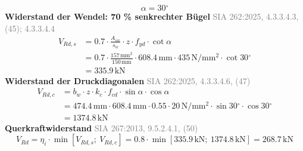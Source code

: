 \documentclass[11pt,a4paper]{article}
\newcommand{\normref}[1]{{\small\textcolor{gray}{#1}}}
\begin{document}
\begin{equation*}
\alpha = 30{}^{\circ}
\end{equation*}
\noindent\textbf{Widerstand der Wendel: 70 \% senkrechter Bügel} \hfill \normref{SIA 262:2025, 4.3.3.4.3, (45); 4.3.3.4.4}
\begin{equation*}
\begin{aligned}
  V_{Rd,s} &= 0.7 \cdot \frac{A_{sw}}{s_w} \cdot z \cdot f_{yd} \cdot \cot \alpha \\
  &= 0.7 \cdot \frac{157\,\mathrm{mm}^{2}}{150\,\mathrm{mm}} \cdot 608.4\,\mathrm{mm} \cdot 435\,\mathrm{N}/\mathrm{mm}^{2} \cdot \cot 30{}^{\circ} \\
  &= 335.9\,\mathrm{kN}
\end{aligned}
\end{equation*}
\noindent\textbf{Widerstand der Druckdiagonalen} \hfill \normref{SIA 262:2025, 4.3.3.4.6, (47)}
\begin{equation*}
\begin{aligned}
  V_{Rd,c} &= b_w \cdot z \cdot k_c \cdot f_{cd} \cdot \sin \alpha \cdot \cos \alpha \\
  &= 474.4\,\mathrm{mm} \cdot 608.4\,\mathrm{mm} \cdot 0.55 \cdot 20\,\mathrm{N}/\mathrm{mm}^{2} \cdot \sin 30{}^{\circ} \cdot \cos 30{}^{\circ} \\
  &= 1374.8\,\mathrm{kN}
\end{aligned}
\end{equation*}
\noindent\textbf{Querkraftwiderstand} \hfill \normref{SIA 267:2013, 9.5.2.4.1, (50)}
\begin{equation*}
V_{Rd} = \eta_i \cdot \min\left[V_{Rd,s};\ V_{Rd,c}\right] = 0.8 \cdot \min\left[335.9\,\mathrm{kN};\ 1374.8\,\mathrm{kN}\right] = 268.7\,\mathrm{kN}
\end{equation*}
\end{document}
